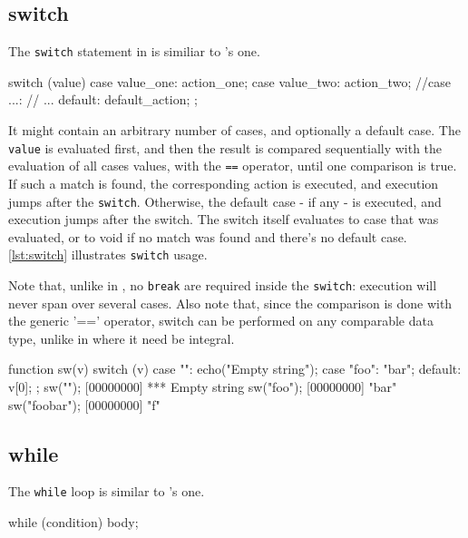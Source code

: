 \subsection{switch}

The \lstinline|switch| statement in \us is similiar to \C's one.

\begin{urbiscript}[frame=, backgroundcolor=, ]
  switch (value)
  {
    case value_one:
      action_one;
    case value_two:
      action_two;
  //case ...:
  //  ...
    default:
      default_action;
  };
\end{urbiscript}

It might contain an arbitrary number of cases, and optionally a
default case. The \lstinline|value| is evaluated first, and then the
result is compared sequentially with the evaluation of all cases
values, with the \lstinline|==| operator, until one comparison is
true. If such a match is found, the corresponding action is executed,
and execution jumps after the \lstinline|switch|. Otherwise, the
default case - if any - is executed, and execution jumps after the
switch. The switch itself evaluates to case that was evaluated, or to
void if no match was found and there's no default case. \autoref{lst:switch}
illustrates \lstinline|switch| usage.

Note that, unlike in \C, no \lstinline|break| are required inside the
\lstinline|switch|: execution will never span over several cases. Also
note that, since the comparison is done with the generic '=='
operator, switch can be performed on any comparable data type, unlike
in \C where it need be integral.

\begin{urbiscript}[caption=The \lstinline|switch| construct,
  label=lst:switch, float=\floatpos]
  function sw(v)
  {
    switch (v)
    {
      case "":
        echo("Empty string");
      case "foo":
        "bar";
      default:
        v[0];
    }
  };
  sw("");
  [00000000] *** Empty string
  sw("foo");
  [00000000] "bar"
  sw("foobar");
  [00000000] "f"
\end{urbiscript}

\subsection{while}

The \lstinline|while| loop is similar to \C's one.

\begin{urbiscript}[frame=, backgroundcolor=, ]
  while (condition)
    body;
\end{urbiscript}

